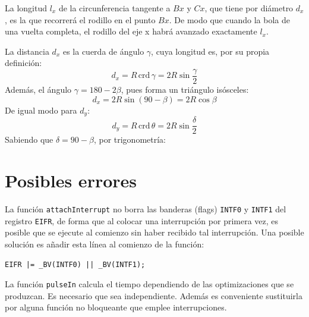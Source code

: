 \documentclass[10pt,a4paper,hidelinks]{article}
\begin{document}
\begin{multicols}{2}
\begin{center}
\end{center}

La longitud $l_x$ de la circunferencia tangente a $Bx$ y $Cx$, que tiene por 
diámetro $d_x$, es la que recorrerá el rodillo en el punto $Bx$. De modo que 
cuando la bola de una vuelta completa, el rodillo del eje x habrá avanzado 
exactamente $l_x$.

La distancia $d_x$ es la cuerda de ángulo $\gamma$, cuya longitud es, por su 
propia definición:
$$ d_x = R \, \text{crd} \, \gamma = 2R \sin \frac{\gamma}{2}$$
Además, el ángulo $\gamma = 180 - 2\beta$, pues forma un triángulo isósceles:
$$ d_x = 2R \sin(90-\beta) = 2R\cos \beta$$
De igual modo para $d_y$:
$$ d_y = R \, \text{crd} \, \theta = 2R \sin \frac{\delta}{2} $$
Sabiendo que $\delta = 90 - \beta$, por trigonometría:



\section{Posibles errores}

La función \texttt{attachInterrupt} no borra las banderas (flags) \texttt{INTF0} 
y \texttt{INTF1} del registro \texttt{EIFR}, de forma que al colocar una 
interrupción por primera vez, es posible que se ejecute al comienzo sin haber 
recibido tal interrupción. Una posible solución es añadir esta línea al comienzo 
de la función:

\texttt{EIFR |= \_BV(INTF0) || \_BV(INTF1);}

La función \texttt{pulseIn} calcula el tiempo dependiendo de las optimizaciones
que se produzcan. Es necesario que sea independiente. Además es conveniente
sustituirla por alguna función no bloqueante que emplee interrupciones.
\\

\end{multicols}
\end{document}
